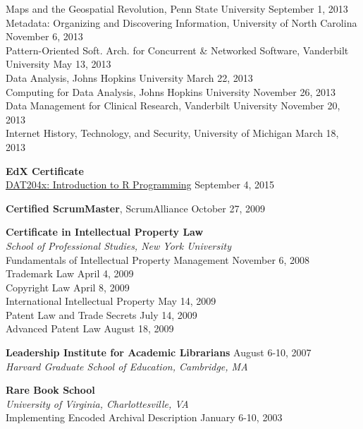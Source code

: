 \documentclass[]{res} %
\begin{document}
\begin{resume}
Maps and the Geospatial Revolution, Penn State University \hfill  September 1, 2013 \\
Metadata: Organizing and Discovering Information, University of North Carolina \hfill  November 6, 2013 \\
Pattern-Oriented Soft. Arch. for Concurrent \& Networked Software, Vanderbilt University \hfill  May 13, 2013 \\
Data Analysis, Johns Hopkins University \hfill  March 22, 2013 \\
Computing for Data Analysis, Johns Hopkins University \hfill  November 26, 2013 \\
Data Management for Clinical Research, Vanderbilt University \hfill  November 20, 2013 \\
Internet History, Technology, and Security, University of Michigan \hfill  March 18, 2013

{\bf EdX Certificate} \\
\href{https://s3.amazonaws.com/verify.edx.org/downloads/98d8d11c3f9b4ab0a59b92d489d3018c/Certificate.pdf}{DAT204x: Introduction to R Programming} \hfill  September 4, 2015 

{\bf Certified ScrumMaster}, ScrumAlliance \hfill October 27, 2009

{\bf Certificate in Intellectual Property Law} \\
{\sl School of Professional Studies, New York University} \\
Fundamentals of Intellectual Property Management \hfill November 6, 2008 \\
Trademark Law \hfill April 4, 2009 \\
Copyright Law \hfill April 8, 2009 \\
International Intellectual Property \hfill May 14, 2009 \\
Patent Law and Trade Secrets \hfill July 14, 2009 \\
Advanced Patent Law \hfill August 18, 2009

{\bf Leadership Institute for Academic Librarians} \hfill August 6-10, 2007 \\
{\sl Harvard Graduate School of Education, Cambridge, MA } 

{\bf Rare Book School} \\
{\sl University of Virginia, Charlottesville, VA } \\
Implementing Encoded Archival Description \hfill January 6-10, 2003 



\end{resume}
\end{document}
